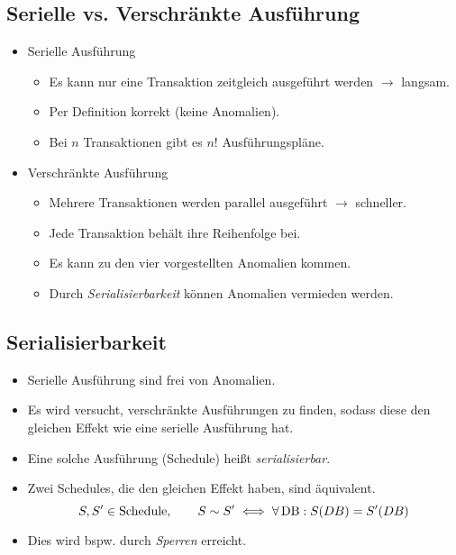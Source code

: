 		\subsection{Serielle vs. Verschränkte Ausführung} %
			\begin{itemize}
				\item Serielle Ausführung
					\begin{itemize}
						\item Es kann nur eine Transaktion zeitgleich ausgeführt werden \( \rightarrow \) langsam.
						\item Per Definition korrekt (keine Anomalien).
						\item Bei \(n\) Transaktionen gibt es \(n!\) Ausführungspläne.
					\end{itemize}
				\item Verschränkte Ausführung
					\begin{itemize}
						\item Mehrere Transaktionen werden parallel ausgeführt \( \rightarrow \) schneller.
						\item Jede Transaktion behält ihre Reihenfolge bei.
						\item Es kann zu den vier vorgestellten Anomalien kommen.
						\item Durch \textit{Serialisierbarkeit} können Anomalien vermieden werden.
					\end{itemize}
			\end{itemize}

		\subsection{Serialisierbarkeit} %
			\begin{itemize}
				\item Serielle Ausführung sind frei von Anomalien.
				\item Es wird versucht, verschränkte Ausführungen zu finden, sodass diese den gleichen Effekt wie eine serielle Ausführung hat.
				\item Eine solche Ausführung (Schedule) heißt \textit{serialisierbar}.
				\item Zwei Schedules, die den gleichen Effekt haben, sind äquivalent.
					\begin{equation*}
						S, S' \in \text{Schedule}, \quad\quad S \sim S' \iff \forall \operatorname{DB} : S(DB) = S'(DB)
					\end{equation*}
				\item Dies wird bspw. durch \textit{Sperren} erreicht.
			\end{itemize}

